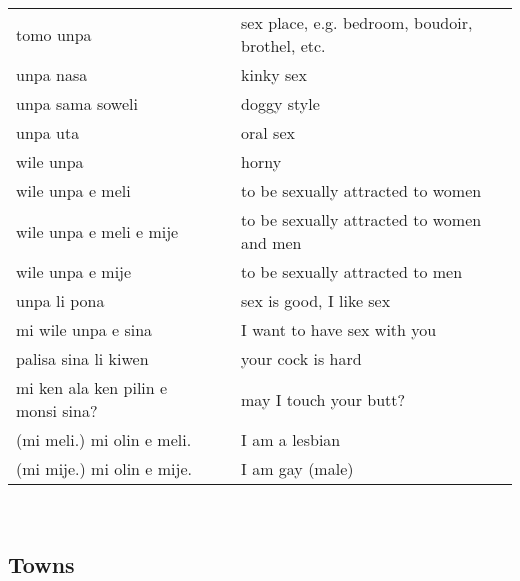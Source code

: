 \begin{supertabular}{p{4,5cm}|ll}
    tomo unpa                          &  & sex place, e.g. bedroom, boudoir, brothel, etc.                                   \\
    unpa nasa                          &  & kinky sex                                                                         \\
    unpa sama soweli                   &  & doggy style                                                                       \\
    unpa uta                           &  & oral sex                                                                          \\
    wile unpa                          &  & horny                                                                             \\
    wile unpa e meli                   &  & to be sexually attracted to women                                                 \\
    wile unpa e meli e mije            &  & to be sexually attracted to women and men                                         \\
    wile unpa e mije                   &  & to be sexually attracted to men                                                   \\
    unpa li pona                       &  & sex is good, I like sex                                                           \\
    mi wile unpa e sina                &  & I want to have sex with you                                                       \\
    palisa sina li kiwen               &  & your cock is hard                                                                 \\
    mi ken ala ken pilin e monsi sina? &  & may I touch your butt?                                                            \\
    (mi meli.) mi olin e meli.         &  & I am a lesbian                                                                    \\
    (mi mije.) mi olin e mije.         &  & I am gay (male)                                                                   \\
\end{supertabular} \\

\subsection{Towns}

